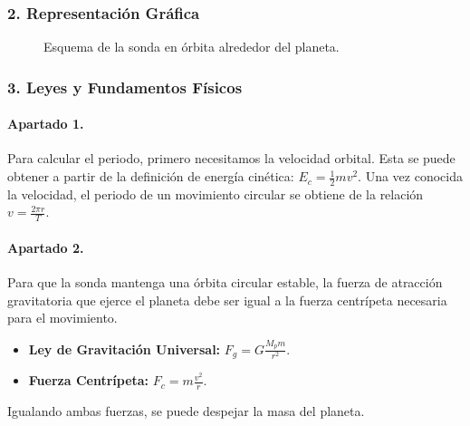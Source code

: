 \subsubsection*{2. Representación Gráfica}
\begin{figure}[H]
    \centering
    \caption{Esquema de la sonda en órbita alrededor del planeta.}
\end{figure}

\subsubsection*{3. Leyes y Fundamentos Físicos}
\paragraph{Apartado 1.} Para calcular el periodo, primero necesitamos la velocidad orbital. Esta se puede obtener a partir de la definición de energía cinética: $E_c = \frac{1}{2}mv^2$. Una vez conocida la velocidad, el periodo de un movimiento circular se obtiene de la relación $v = \frac{2\pi r}{T}$.

\paragraph{Apartado 2.} Para que la sonda mantenga una órbita circular estable, la fuerza de atracción gravitatoria que ejerce el planeta debe ser igual a la fuerza centrípeta necesaria para el movimiento.
\begin{itemize}
    \item \textbf{Ley de Gravitación Universal:} $F_g = G \frac{M_p m}{r^2}$.
    \item \textbf{Fuerza Centrípeta:} $F_c = m \frac{v^2}{r}$.
\end{itemize}
Igualando ambas fuerzas, se puede despejar la masa del planeta.

